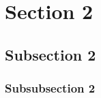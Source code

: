 
\SetCentralFooter{}

\section{Section 2}

  \subsection{Subsection 2}

    \lipsum[1]

    \subsubsection{Subsubsection 2}

      \lipsum[1-7]
      \pagebreak
